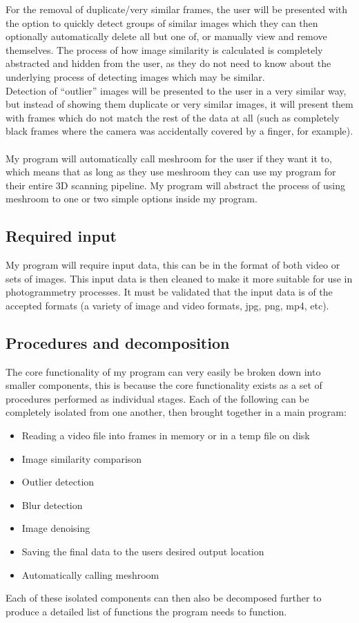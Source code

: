 \documentclass[11pt]{report}
\begin{document}
For the removal of duplicate/very similar frames, the user will be presented with the option to quickly detect groups of similar images which they can then optionally automatically delete all but one of, or manually view and remove themselves.
The process of how image similarity is calculated is completely abstracted and hidden from the user, as they do not need to know about the underlying process of detecting images which may be similar.\\
Detection of ``outlier'' images will be presented to the user in a very similar way, but instead of showing them duplicate or very similar images, it will present them with frames which do not match the rest of the data at all (such as completely black frames where the camera was accidentally covered by a finger, for example).\\\\
My program will automatically call meshroom for the user if they want it to, which means that as long as they use meshroom they can use my program for their entire 3D scanning pipeline. My program will abstract the process of using meshroom to one or two simple options inside my program.

\subsection{Required input}
My program will require input data, this can be in the format of both video or sets of images. This input data is then cleaned to make it more suitable for use in photogrammetry processes. It must be validated that the input data is of the accepted formats (a variety of image and video formats, jpg, png, mp4, etc).

\subsection{Procedures and decomposition}
The core functionality of my program can very easily be broken down into smaller components, this is because the core functionality exists as a set of procedures performed as individual stages. Each of the following can be completely isolated from one another, then brought together in a main program:
\begin{itemize}
\item Reading a video file into frames in memory or in a temp file on disk
\item Image similarity comparison
\item Outlier detection
\item Blur detection
\item Image denoising
\item Saving the final data to the users desired output location
\item Automatically calling meshroom
\end{itemize}
Each of these isolated components can then also be decomposed further to produce a detailed list of functions the program needs to function.
\end{document}
